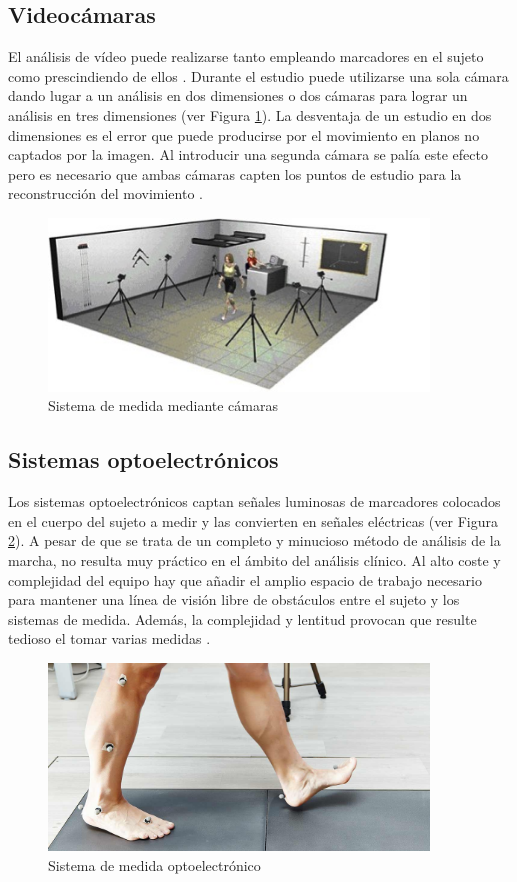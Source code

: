 	
	\subsection{Videocámaras}
	El análisis de vídeo puede realizarse tanto empleando marcadores en el sujeto como prescindiendo de ellos \cite{techniques2}. Durante el estudio puede utilizarse una sola cámara dando lugar a un análisis en dos dimensiones o dos cámaras para lograr un análisis en tres dimensiones (ver Figura \ref{fig:camera}). \cite{prueba} La desventaja de un estudio en dos dimensiones es el error que puede producirse por el movimiento en planos no captados por la imagen. Al introducir una segunda cámara se palía este efecto pero es necesario que ambas cámaras capten los puntos de estudio para la reconstrucción del movimiento \cite{techniques}.
	\begin{figure}[H]
		\centering
		\includegraphics[width=0.9\textwidth]{./graphics/camera}
		\caption{Sistema de medida mediante cámaras} \label{fig:camera}
	\end{figure}
	
	\subsection{Sistemas optoelectrónicos}
	
	Los sistemas optoelectrónicos captan señales luminosas de marcadores colocados en el cuerpo del sujeto a medir y las convierten en señales eléctricas (ver Figura \ref{fig:opt}). A pesar de que se trata de un completo y minucioso método de análisis de la marcha, no resulta muy práctico en el ámbito del análisis clínico. Al alto coste y complejidad del equipo hay que añadir el amplio espacio de trabajo necesario para mantener una línea de visión libre de obstáculos entre el sujeto y los sistemas de medida. Además, la complejidad y lentitud provocan que resulte tedioso el tomar varias medidas \cite{begona,opt}.
		\begin{figure}[H]
			\centering
			\includegraphics[width=0.9\textwidth]{./graphics/opt}
			\caption{Sistema de medida optoelectrónico} \label{fig:opt}
		\end{figure}

